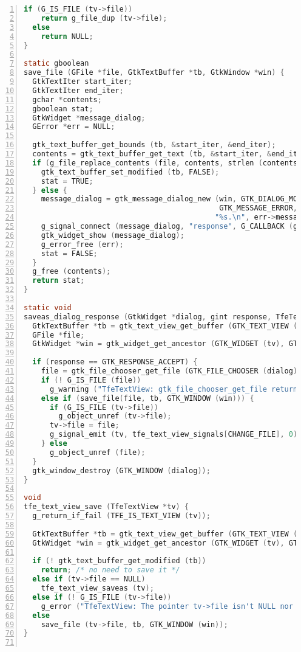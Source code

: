 \begin{lstlisting}[language=C, numbers=left]
  if (G_IS_FILE (tv->file))
    return g_file_dup (tv->file);
  else
    return NULL;
}

static gboolean
save_file (GFile *file, GtkTextBuffer *tb, GtkWindow *win) {
  GtkTextIter start_iter;
  GtkTextIter end_iter;
  gchar *contents;
  gboolean stat;
  GtkWidget *message_dialog;
  GError *err = NULL;

  gtk_text_buffer_get_bounds (tb, &start_iter, &end_iter);
  contents = gtk_text_buffer_get_text (tb, &start_iter, &end_iter, FALSE);
  if (g_file_replace_contents (file, contents, strlen (contents), NULL, TRUE, G_FILE_CREATE_NONE, NULL, NULL, &err)) {
    gtk_text_buffer_set_modified (tb, FALSE);
    stat = TRUE;
  } else {
    message_dialog = gtk_message_dialog_new (win, GTK_DIALOG_MODAL,
                                             GTK_MESSAGE_ERROR, GTK_BUTTONS_CLOSE,
                                            "%s.\n", err->message);
    g_signal_connect (message_dialog, "response", G_CALLBACK (gtk_window_destroy), NULL);
    gtk_widget_show (message_dialog);
    g_error_free (err);
    stat = FALSE;
  }
  g_free (contents);
  return stat;
}

static void
saveas_dialog_response (GtkWidget *dialog, gint response, TfeTextView *tv) {
  GtkTextBuffer *tb = gtk_text_view_get_buffer (GTK_TEXT_VIEW (tv));
  GFile *file;
  GtkWidget *win = gtk_widget_get_ancestor (GTK_WIDGET (tv), GTK_TYPE_WINDOW);

  if (response == GTK_RESPONSE_ACCEPT) {
    file = gtk_file_chooser_get_file (GTK_FILE_CHOOSER (dialog));
    if (! G_IS_FILE (file))
      g_warning ("TfeTextView: gtk_file_chooser_get_file returns non GFile.\n");
    else if (save_file(file, tb, GTK_WINDOW (win))) {
      if (G_IS_FILE (tv->file))
        g_object_unref (tv->file);
      tv->file = file;
      g_signal_emit (tv, tfe_text_view_signals[CHANGE_FILE], 0);
    } else
      g_object_unref (file);
  }
  gtk_window_destroy (GTK_WINDOW (dialog));
}

void
tfe_text_view_save (TfeTextView *tv) {
  g_return_if_fail (TFE_IS_TEXT_VIEW (tv));

  GtkTextBuffer *tb = gtk_text_view_get_buffer (GTK_TEXT_VIEW (tv));
  GtkWidget *win = gtk_widget_get_ancestor (GTK_WIDGET (tv), GTK_TYPE_WINDOW);

  if (! gtk_text_buffer_get_modified (tb))
    return; /* no need to save it */
  else if (tv->file == NULL)
    tfe_text_view_saveas (tv);
  else if (! G_IS_FILE (tv->file))
    g_error ("TfeTextView: The pointer tv->file isn't NULL nor GFile.\n");
  else
    save_file (tv->file, tb, GTK_WINDOW (win));
}


\end{lstlisting}
